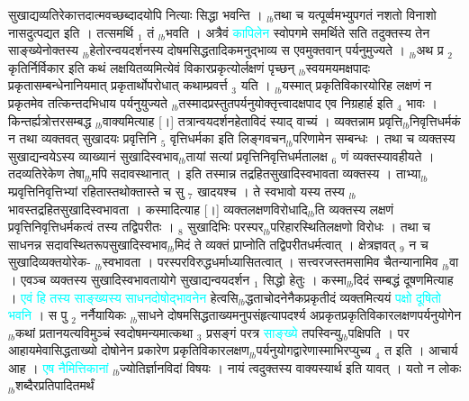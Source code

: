 \documentclass[article,12pt,a4paper]{memoir}%
\newcommand{\quotelemma}[1]{\textcolor{cyan}{#1}}
\begin{document}
सुखाद्यव्यतिरेकात्तदात्मवच्छब्दादयोपि नित्याः सिद्धा भवन्ति । {\tiny $_{lb}$}तथा च यत्पूर्व्वमभ्युपगतं नशतो विनाशो नासदुत्पद्यत इति । तत्समर्थि {\tiny $_{1}$} तं {\tiny $_{lb}$}भवति । अत्रैवं \quotelemma{कापिलेन} स्वोपगमे समर्थिते सति तदुक्तस्य तेन साङ्ख्येनोक्तस्य {\tiny $_{lb}$}हेतोरन्वयदर्शनस्य दोषमसिद्धतादिकमनुद्भाव्य स एवमुक्तवान् पर्यनुमुज्यते । {\tiny $_{lb}$}अथ प्र {\tiny $_{2}$} कृतिर्निर्विकार इति कथं लक्षयितव्यमित्येवं विकारप्रकृत्योर्लक्षणं पृच्छन् {\tiny $_{lb}$}स्वयमयमक्षपादः प्रकृतासम्बन्धेनानियमात् प्रकृतार्थोपरोधात् कथाम्प्रवर्त्त {\tiny $_{3}$} यति । {\tiny $_{lb}$}यस्मात् प्रकृतिविकारयोरिह लक्षणं न प्रकृतमेव तत्किन्तदभिधाय पर्यनुयुज्यते {\tiny $_{lb}$}तस्मादप्रस्तुतपर्यनुयोक्तृत्त्वादक्षपाद एव निग्रहार्ह इति {\tiny $_{4}$} भावः । किन्तर्ह्यत्रोत्तरसम्बद्ध {\tiny $_{lb}$}वाक्यमित्याह [।] तत्रान्वयदर्शनहेताविदं स्याद् वाच्यं \cite[20a1]{vn-msN} । व्यक्तन्नाम प्रवृत्ति{\tiny $_{lb}$}निवृत्तिधर्मकं न तथा व्यक्तवत् सुखादयः प्रवृत्तिनि {\tiny $_{5}$} वृत्तिधर्मका इति लिङ्गवचन{\tiny $_{lb}$}परिणामेन सम्बन्धः । तथा च व्यक्तस्य सुखाद्यन्वयेऽस्य व्याख्यानं सुखादिस्वभाव{\tiny $_{lb}$}तायां सत्यां प्रवृत्तिनिवृत्तिधर्मतालक्ष {\tiny $_{6}$} णं व्यक्तस्यावहीयते । तदव्यतिरेकेण तेषा{\tiny $_{lb}$}मपि सदावस्थानात् । इति तस्मान्न तद्रहितसुखादिस्वभावता व्यक्तस्य । ताभ्या{\tiny $_{lb}$}म्प्रवृत्तिनिवृत्तिभ्यां रहितास्तथोक्तास्ते च सु {\tiny $_{7}$} खादयश्च । ते स्वभावो यस्य तस्य {\tiny $_{lb}$}भावस्तद्रहितसुखादिस्वभावता । कस्मादित्याह [।] व्यक्तलक्षणविरोधादि\cite[20a2]{vn-msN}{\tiny $_{lb}$}\leavevmode{}ति व्यक्तस्य लक्षणं प्रवृत्तिनिवृत्तिधर्मकत्वं तस्य तद्विपरीतः । {\tiny $_{8}$} सुखादिभिः परस्पर{\tiny $_{lb}$}परिहारस्थितिलक्षणो विरोधः । तथा च साधनन्न सदावस्थितरूपसुखादिस्वभाव{\tiny $_{lb}$}मिदं ते व्यक्तं प्राप्नोति तद्विपरीतधर्मत्वात् । क्षेत्रज्ञवत् {\tiny $_{9}$} \leavevmode{} न च सुखादिव्यक्तयोरेक- {\tiny $_{lb}$}स्वभावता । परस्परविरुद्धधर्माध्यासितत्वात् । सत्त्वरजस्तमसामिव चैतन्यानामिव {\tiny $_{lb}$}वा । एवञ्च व्यक्तस्य सुखादिस्वभावतायोगे सुखाद्यन्वयदर्शन {\tiny $_{1}$} सिद्धो हेतुः । कस्मा{\tiny $_{lb}$}दिदं सम्बद्धं दूषणमित्याह । \quotelemma{एवं हि तस्य साङ्ख्यस्य साधनदोषोद्भावनेन} हेत्वसि{\tiny $_{lb}$}द्धताचोदनेनैकप्रकृतीदं व्यक्तमित्ययं \quotelemma{पक्षो दूषितो भवनि} \cite[20a3]{vn-msN} । स पु {\tiny $_{2}$} नर्नैयायिकः {\tiny $_{lb}$}साधने दोषमसिद्धताख्यमनुपसंहृत्यापदर्श्य अप्रकृतप्रकृतिविकारलक्षणपर्यनुयोगेन {\tiny $_{lb}$}कथां प्रतानयत्यविमुञ्चं स्वदोषमन्यमात्कथा {\tiny $_{3}$} प्रसङ्गं परत्र \quotelemma{साङ्ख्ये} तपस्विन्यु{\tiny $_{lb}$}पक्षिपति । पर आहायमेवासिद्धताख्यो दोषोनेन प्रकारेण प्रकृतिविकारलक्षण{\tiny $_{lb}$}पर्यनुयोगद्वारेणास्माभिरप्युच्य {\tiny $_{4}$} त इति । आचार्य आह । \quotelemma{एष नैमित्तिकानां} \cite[20a3]{vn-msN} {\tiny $_{lb}$}ज्योतिर्ज्ञानविदां विषयः । नायं त्वदुक्तस्य वाक्यस्यार्थ इति यावत् । यतो न लोकः {\tiny $_{lb}$}शब्दैरप्रतिपादितमर्थं 
\end{document}
